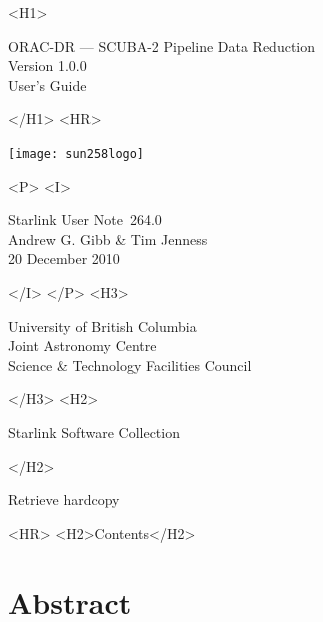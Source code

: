 \documentclass[twoside,11pt]{article}
\newcommand{\stardoccategory}  {Starlink User Note}
\newcommand{\stardocsource}    {sun\stardocnumber}
\newcommand{\stardocnumber}    {264.0}
\newcommand{\stardocauthors}   {Andrew G. Gibb \& Tim Jenness}
\newcommand{\stardocdate}      {20 December 2010}
\newcommand{\stardoctitle}     {ORAC-DR --- SCUBA-2 Pipeline Data Reduction}
\newcommand{\stardocversion}   {Version 1.0.0}
\newcommand{\stardocmanual}    {User's Guide}
\newcommand{\htmladdnormallink}[2]{#1}
\newcommand{\htmladdimg}[1]{}
\newcommand{\htmlref}[2]{#1}
\newcommand{\htmladdtonavigation}[1]{}
\newcommand{\xlabel}[1]{}
\renewcommand{\_}{\texttt{\symbol{95}}}
\begin{document}
\begin{htmlonly}
   \xlabel{}
   \begin{rawhtml} <H1> \end{rawhtml}
      \stardoctitle\\
      \stardocversion\\
      \stardocmanual
   \begin{rawhtml} </H1> <HR> \end{rawhtml}

\texttt{[image: sun258\_logo]}

   \begin{rawhtml} <P> <I> \end{rawhtml}
   \stardoccategory\ \stardocnumber \\
   \stardocauthors \\
   \stardocdate
   \begin{rawhtml} </I> </P> <H3> \end{rawhtml}
      \htmladdnormallink{University of British Columbia}
                        {http://www.ubc.ca} \\
      \htmladdnormallink{Joint Astronomy Centre}
                        {http://www.jach.hawaii.edu}\\
      \htmladdnormallink{Science \& Technology Facilities Council}
                        {http://www.pparc.ac.uk} \\
   \begin{rawhtml} </H3> <H2> \end{rawhtml}
      \htmladdnormallink{Starlink Software Collection}{http://starlink.jach.hawaii.edu/}
   \begin{rawhtml} </H2> \end{rawhtml}
   \htmladdnormallink{\htmladdimg{source.gif} Retrieve hardcopy}
      {http://starlink.jach.hawaii.edu/cgi-bin/hcserver?\stardocsource}\\

  \label{stardoccontents}
  \begin{rawhtml}
    <HR>
    <H2>Contents</H2>
  \end{rawhtml}
  \htmladdtonavigation{\htmlref{\htmladdimg{contents_motif.gif}}
        {stardoccontents}}

  \section{\xlabel{abstract}Abstract}
\end{htmlonly}
\end{document}
